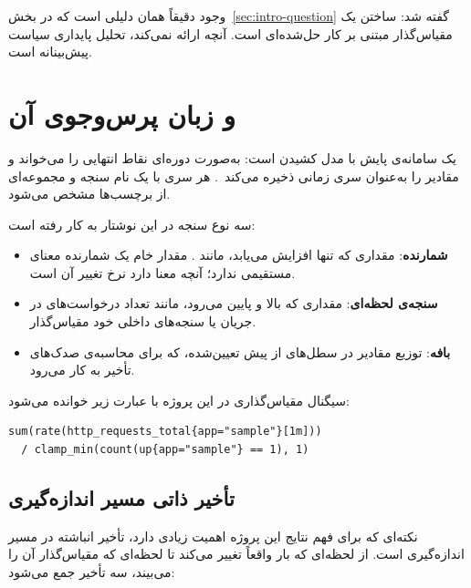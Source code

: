 وجود  دقیقاً همان دلیلی است که در بخش~\ref{sec:intro-question} گفته شد: ساختن یک
مقیاس‌گذار مبتنی بر  کار حل‌شده‌ای است. آنچه  ارائه نمی‌کند، تحلیل
پایداری سیاست پیش‌بینانه است.

\section{ و زبان پرس‌وجوی آن}
\label{sec:bg-prometheus}

 یک سامانه‌ی پایش با مدل کشیدن است: به‌صورت دوره‌ای نقاط
انتهایی  را می‌خواند و مقادیر را به‌عنوان سری زمانی ذخیره می‌کند~\cite{prometheus}.
هر سری با یک نام سنجه و مجموعه‌ای از برچسب‌ها مشخص می‌شود.

سه نوع سنجه در این نوشتار به کار رفته است:

\begin{itemize}
  \item \textbf{شمارنده}: مقداری که تنها افزایش می‌یابد، مانند
  . مقدار خام یک شمارنده معنای مستقیمی ندارد؛ آنچه معنا دارد نرخ
  تغییر آن است.
  \item \textbf{سنجه‌ی لحظه‌ای}: مقداری که بالا و پایین می‌رود، مانند
  تعداد درخواست‌های در جریان یا سنجه‌های داخلی خود مقیاس‌گذار.
  \item \textbf{بافه}: توزیع مقادیر در سطل‌های از پیش تعیین‌شده، که
  برای محاسبه‌ی صدک‌های تأخیر به کار می‌رود.
\end{itemize}

سیگنال مقیاس‌گذاری در این پروژه با عبارت زیر خوانده می‌شود:

\begin{latin}
\begin{lstlisting}[language=promql]
sum(rate(http_requests_total{app="sample"}[1m]))
  / clamp_min(count(up{app="sample"} == 1), 1)
\end{lstlisting}
\end{latin}

\subsection{تأخیر ذاتی مسیر اندازه‌گیری}
\label{sec:bg-measurement-lag}

نکته‌ای که برای فهم نتایج این پروژه اهمیت زیادی دارد، تأخیر انباشته در مسیر اندازه‌گیری است.
از لحظه‌ای که بار واقعاً تغییر می‌کند تا لحظه‌ای که مقیاس‌گذار آن را می‌بیند، سه تأخیر جمع
می‌شود:

